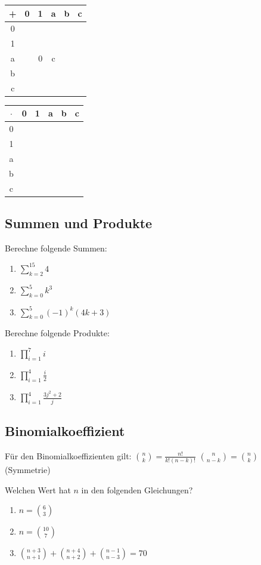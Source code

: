 \documentclass[11pt, a4paper]{article}
\begin{document}
\begin{center}
	\begin{tabular}{c|ccccc}
		+ & 0 & 1 & a & b & c \\ \hline
		0 &  &  &  &  & \\
		1 &  &  &  &  & \\
		a &  & 0 & c &  & \\
		b &  &  &  &  & \\
		c &  &  &  &  & \\
	\end{tabular}
	\hspace{2cm}
	\begin{tabular}{c|ccccc}
		$\cdot$ & 0 & 1 & a & b & c \\ \hline
		0 &  &  &  &  & \\
		1 &  &  &  &  & \\
		a &  &  &  &  & \\
		b &  &  &  &  & \\
		c &  &  &  &  & \\
	\end{tabular}
\end{center}

\subsection{Summen und Produkte}
Berechne folgende Summen:
\begin{enumerate}
	\item $\sum_{k=2}^{15} 4$
	\item $\sum_{k=0}^5 k^3$
	\item $\sum_{k=0}^5 (-1)^k (4k+3)$
\end{enumerate}
Berechne folgende Produkte:
\begin{enumerate}
	\item $\prod_{i=1}^7 i$
	\item $\prod_{i=1}^4 \frac{i}{2}$
	\item $\prod_{i=1}^4 \frac{3j^2+2}{j}$
\end{enumerate}

\subsection{Binomialkoeffizient}
Für den Binomialkoeffizienten gilt:
$\binom{n}{k} = \frac{n!}{k!(n-k)!}$ \qquad $\binom{n}{n-k} = \binom{n}{k}$ (Symmetrie)

Welchen Wert hat $n$ in den folgenden Gleichungen?
\begin{enumerate}
	\item $ n = \binom{6}{3}$
	\item $n = \binom{10}{7}$
	\item $\binom{n+3}{n+1} + \binom{n+4}{n+2} + \binom{n-1}{n-3} = 70$
\end{enumerate}
\end{document}
